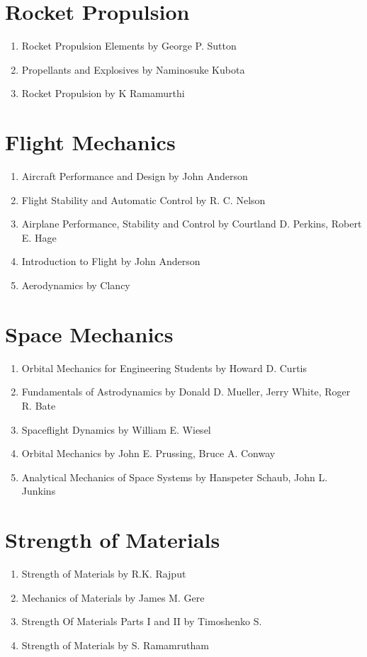 \section{Rocket Propulsion}
\begin{enumerate}
  \item Rocket Propulsion Elements by George P. Sutton
  \item Propellants and Explosives by Naminosuke Kubota
  \item Rocket Propulsion by K Ramamurthi
\end{enumerate}

\section{Flight Mechanics}
\begin{enumerate}
  \item Aircraft Performance and Design by John Anderson
  \item Flight Stability and Automatic Control by R. C. Nelson
  \item Airplane Performance, Stability and Control by Courtland D. Perkins, Robert E. Hage
  \item Introduction to Flight by John Anderson
  \item Aerodynamics by Clancy
\end{enumerate}

\section{Space Mechanics}
\begin{enumerate}
  \item Orbital Mechanics for Engineering Students by Howard D. Curtis
  \item Fundamentals of Astrodynamics by Donald D. Mueller, Jerry White, Roger R. Bate
  \item Spaceflight Dynamics by William E. Wiesel
  \item Orbital Mechanics by John E. Prussing, Bruce A. Conway
  \item Analytical Mechanics of Space Systems by Hanspeter Schaub, John L. Junkins
\end{enumerate}

\section{Strength of Materials}
\begin{enumerate}
  \item Strength of Materials by R.K. Rajput
  \item Mechanics of Materials by James M. Gere
  \item Strength Of Materials Parts I and II by Timoshenko S.
  \item Strength of Materials by S. Ramamrutham
\end{enumerate}

